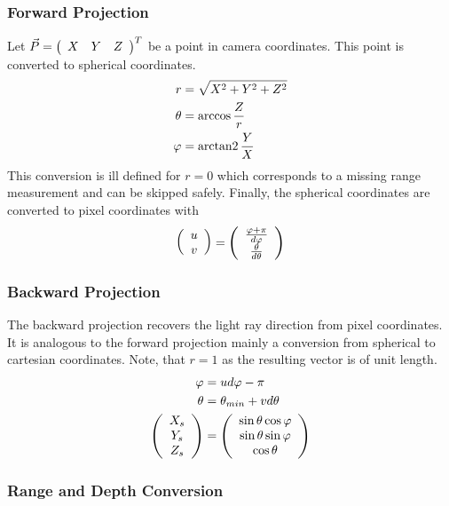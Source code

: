 \subsubsection*{Forward Projection}

Let $\vec{P} = \left(\begin{array}{ccc} X & Y & Z \end{array}\right)^T$ be a point in camera coordinates.
This point is converted to spherical coordinates.
\begin{equation}
\begin{aligned}
    r       &= \sqrt{X^2 + Y^2 + Z^2} \\
    \theta  &= \arccos{\frac{Z}{r}} \\
    \varphi &= \operatorname{arctan2}{\frac{Y}{X}}
\end{aligned}
\end{equation}
This conversion is ill defined for $r = 0$ which corresponds to a missing range measurement and can be skipped safely.
Finally, the spherical coordinates are converted to pixel coordinates with
\begin{equation}
\begin{aligned} 
    \left(\begin{array}{c} u \\ v \end{array}\right) = \left(\begin{array}{c} \frac{\varphi + \pi}{d\varphi} \\ \frac{\theta}{d\theta} \end{array}\right)
\end{aligned}
\end{equation}

\subsubsection*{Backward Projection}

The backward projection recovers the light ray direction from pixel coordinates.
It is analogous to the forward projection mainly a conversion from spherical to cartesian coordinates.
Note, that $r = 1$ as the resulting vector is of unit length.
\begin{equation}
\begin{aligned}
    \varphi &= u d\varphi - \pi \\
    \theta &= \theta_{min} + v d\theta \\
    \left(\begin{array}{c} X_s \\ Y_s \\ Z_s \end{array}\right) &= \left(\begin{array}{c} \sin \theta \cos \varphi \\ \sin \theta \sin \varphi \\ \cos \theta \end{array}\right)
\end{aligned}
\end{equation}

\subsubsection{Range and Depth Conversion}\label{sec:range_depth_conversion}

